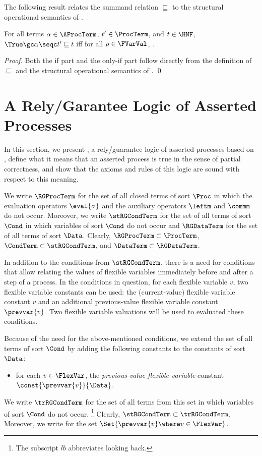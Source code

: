 \documentclass[runningheads]{llncs}
\begin{document}
The following result relates the summand relation $\sqsubseteq$ to the 
structural operational semantics of \deACPei.
%
\begin{lemma}
\label{lemma-summand}
For all terms $\alpha \in \AProcTerm$, $t' \in \ProcTerm$, and 
$t \in \HNF$, $\True \gc \alpha \seqc t' \sqsubseteq t$ iff
for all $\rho \in \FVarVal$, 
.
\end{lemma}
%
\begin{proof}
Both the if part and the only-if part follow directly from the
definition of $\sqsubseteq$ and the structural operational semantics of
\deACPei.
\qed
\end{proof}

\section{A Rely/Garantee Logic of Asserted Processes}
\label{sect-rely-guar}

In this section, we present \RG, a rely/guarantee logic of asserted 
processes based on \deACPei, define what it means that an asserted 
process is true in the sense of partial correctness, and show that the 
axioms and rules of this logic are sound with respect to this meaning.

We write $\RGProcTerm$ for the set of all closed terms of sort $\Proc$ 
in which the evaluation operators $\eval{\sigma}$ and the auxiliary 
operators $\leftm$ and $\commm$ do not occur.
Moreover, we write $\stRGCondTerm$ for the set of all terms of sort 
$\Cond$ in which variables of sort $\Cond$ do not occur and 
$\RGDataTerm$ for the set of all terms of sort $\Data$.
%
Clearly, $\RGProcTerm \subset \ProcTerm$, 
$\CondTerm \subset \stRGCondTerm$, and $\DataTerm \subset \RGDataTerm$. 

In addition to the conditions from $\stRGCondTerm$, there is a need for 
conditions that allow relating the values of flexible variables 
immediately before and after a step of a process.
In the conditions in question, for each flexible variable $v$, two 
flexible variable constants can be used: the (current-value) flexible 
variable constant $v$ and an additional previous-value flexible variable 
constant $\prevvar{v}$.
Two flexible variable valuations will be used to evaluated these 
conditions.

Because of the need for the above-mentioned conditions, we extend the 
set of all terms of sort $\Cond$ by adding the following constants to 
the constants of sort~$\Data$: 
\begin{itemize}
\item
for each $v \in \FlexVar$, the \emph{previous-value flexible variable} 
constant $\const{\prevvar{v}}{\Data}$.
\end{itemize}
We write $\trRGCondTerm$ for the set of all terms from this set in which 
variables of sort $\Cond$ do not occur.%
\footnote{The subscript $\mathit{lb}$ abbreviates looking back.}
%
Clearly, $\stRGCondTerm \subset \trRGCondTerm$.
%
Moreover, we write \smash{$\prevvar{\FlexVar}$} for the set 
$\Set{\prevvar{v} \where v \in \FlexVar}$.
\end{document}

